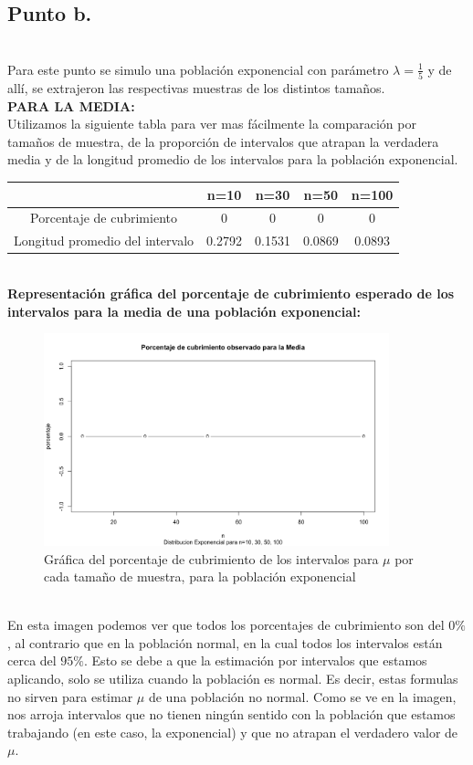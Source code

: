 \documentclass[letterpaper,12pt,onecolumn,titlepage]{article}
\begin{document}
\pagebreak\subsection{Punto b.}
~\\ Para este punto se simulo una poblaci\'{o}n exponencial con par\'{a}metro $\lambda=\frac{1}{5}$ y de all\'{i}, se extrajeron las respectivas muestras de los distintos tama\~{n}os.
~\\ \textbf{PARA LA MEDIA:}
~\\ Utilizamos la siguiente tabla para ver mas f\'{a}cilmente la comparaci\'{o}n por tama\~{n}os de muestra, de la proporci\'{o}n de intervalos que atrapan la verdadera media y de la longitud promedio de los intervalos para la poblaci\'{o}n exponencial.
\begin{center}
\begin{tabular}{|c|c|c|c|c|}
\hline 
\rule[-1ex]{0pt}{2.5ex}  & n=10 & n=30 & n=50 & n=100 \\ 
\hline 
\rule[-1ex]{0pt}{2.5ex} Porcentaje de cubrimiento & 0 & 0 & 0 & 0 \\ 
\hline 
\rule[-1ex]{0pt}{2.5ex} Longitud promedio del intervalo & 0.2792 & 0.1531 & 0.0869 & 0.0893 \\ 
\hline 
\end{tabular} 
\end{center}
~\\\textbf{Representaci\'{o}n gr\'{a}fica del porcentaje de cubrimiento esperado de los intervalos para la media de una poblaci\'{o}n exponencial:}
~\\ \begin{figure}[!h]
    \begin{center}
        \includegraphics[width=10cm]{Figuras/Pc1.png}
        \caption{Gr\'{a}fica del porcentaje de cubrimiento de los intervalos para $\mu$ por cada tama\~{n}o de muestra, para la poblaci\'{o}n exponencial}
        \label{fig:Densidad}
    \end{center}
\end{figure}
~\\ En esta imagen podemos ver que todos los porcentajes de cubrimiento son del $0\%$, al contrario que en la poblaci\'{o}n normal, en la cual todos los intervalos est\'{a}n cerca del $95\%$. Esto se debe a que la estimaci\'{o}n por intervalos que estamos aplicando, solo se utiliza cuando la poblaci\'{o}n es normal. Es decir, estas formulas no sirven para estimar $\mu$ de una poblaci\'{o}n no normal. Como se ve en la imagen, nos arroja intervalos que no tienen ning\'{u}n sentido con la poblaci\'{o}n que estamos trabajando (en este caso, la exponencial) y que no atrapan el verdadero valor de $\mu$.
\end{document}
